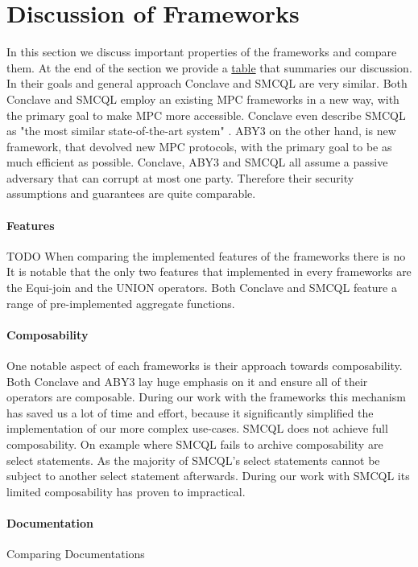 \section{Discussion of Frameworks}
In this section we discuss important properties of the frameworks and compare them. 
At the end of the section we provide a \hyperref[Summary]{table} that summaries our discussion.
In their goals and general approach Conclave and SMCQL are very similar. Both Conclave and SMCQL employ an existing MPC frameworks in a new way, with the primary goal to make MPC more accessible. Conclave even describe SMCQL as "the most similar state-of-the-art system" \cite{10.1145/3302424.3303982}. ABY3 on the other hand, is new framework, that devolved new MPC protocols, with the primary goal to be as much efficient as possible. 
Conclave, ABY3 and SMCQL all assume a passive adversary that can corrupt at most one party. Therefore their security assumptions and guarantees are quite comparable. 
\paragraph{Features} TODO
When comparing the implemented features of the frameworks there is no 
It is notable that the only two features that implemented in every frameworks are the Equi-join and the UNION operators. 
Both Conclave and SMCQL feature a range of pre-implemented aggregate functions.  
\paragraph{Composability}
One notable aspect of each frameworks is their approach towards composability. Both Conclave and ABY3 lay huge emphasis on it and ensure all of their operators are composable. During our work with the frameworks this mechanism has saved us a lot of time and effort, because it significantly simplified the implementation of our more complex use-cases.
SMCQL does not achieve full composability. On example where SMCQL fails to archive composability are select statements. As the majority of SMCQL's select statements cannot be subject to another select statement afterwards. During our work with SMCQL its limited composability has proven to impractical. 
\paragraph{Documentation}
Comparing Documentations 
